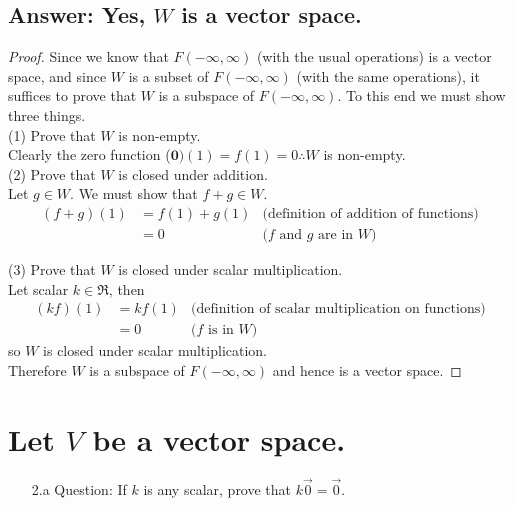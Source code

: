 \documentclass[12pt]{article}
\begin{document}
\subsection{Answer: Yes, $W$ is a vector space.}
\begin{proof}
        Since we know that $F(-\infty, \infty)$ (with the usual operations) is a vector space,
        and since $W$ is a subset of $F(-\infty, \infty)$ (with the same operations),
        it suffices to prove that $W$ is a subspace of $F(-\infty, \infty)$. To this end we must show three things.\\

        (1) Prove that $W$ is non-empty.\\
        Clearly the zero function ($\mathbf{0})(1)=f(1)=0\therefore W$ is non-empty.\\

        (2) Prove that $W$ is closed under addition.\\
        Let $g \in W$. We must show that $f+g \in W$.
        \begin{align*}
                (f+g)(1) & = f(1) + g(1) & \textrm{(definition of addition of functions)} \\
                         & = 0           & \textrm{($f$ and $g$ are in $W$)}
        \end{align*}

        (3) Prove that $W$ is closed under scalar multiplication. \\
        Let scalar $k \in \Re $, then
        \begin{align*}
                (kf)(1) & = kf(1) & \textrm{(definition of scalar multiplication on functions)} \\
                        & = 0     & \textrm{($f$ is in $W$)}
        \end{align*}
        so $W$ is closed under scalar multiplication.\\

        Therefore $W$ is a subspace of $F(-\infty, \infty)$ and hence is a vector space.
\end{proof}
\pagebreak
\section{Let $V$ be a vector space.}
\begin{enumerate}
        \item [2.a]Question: If $k$ is any scalar, prove that $k\vec{0} = \vec{0}$.
\end{enumerate}
\end{document}
